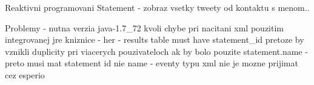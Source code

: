 Reaktivni programovani
Statement - zobraz vsetky tweety od kontaktu s menom..

Problemy
- nutna verzia java-1.7\_72 kvoli chybe pri nacitani xml pouzitim integrovanej jre kniznice
- her
- results table must have statement\_id pretoze by vznikli duplicity pri viacerych pouzivateloch ak by bolo pouzite statement.name - preto musi mat statement id nie name
- eventy typu xml nie je mozne prijimat cez esperio